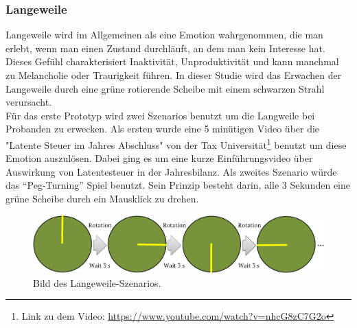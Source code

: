 \subsubsection{Langeweile} \label{langeweile-1}


Langeweile wird im Allgemeinen als eine Emotion wahrgenommen, die man erlebt, wenn man einen Zustand durchläuft, an dem man kein Interesse hat\cite{vodanovich_2003}. 
Dieses Gefühl charakterisiert Inaktivität, Unproduktivität und kann manchmal zu Melancholie oder Traurigkeit führen.
In dieser Studie wird das Erwachen der Langeweile durch eine grüne rotierende Scheibe mit einem schwarzen Strahl verursacht. \\

Für das erste Prototyp wird zwei Szenarios benutzt um die Langweile bei Probanden zu erwecken.
Als ersten wurde eine 5 minütigen Video über die "Latente Steuer im Jahres Abschluss" von der Tax Universität\footnote{Link zu dem Video: \url{https://www.youtube.com/watch?v=nhcG8zC7G2o}} benutzt um diese Emotion auszulösen. 
Dabei ging es um eine kurze Einführungsvideo über Auswirkung von Latentesteuer in der Jahresbilanz.
Als zweites Szenario würde das ``Peg-Turning'' Spiel benutzt. 
Sein Prinzip besteht darin, alle 3 Sekunden eine grüne Scheibe durch ein Mausklick zu drehen. \\



\begin{figure}[H] \centering
\includegraphics[width=\textwidth]{Images/boredom_game2.png} 
\vspace{-0.3cm} 
\caption{Bild des Langeweile-Szenarios.}
\label{fig-glueck} 
\end{figure}


